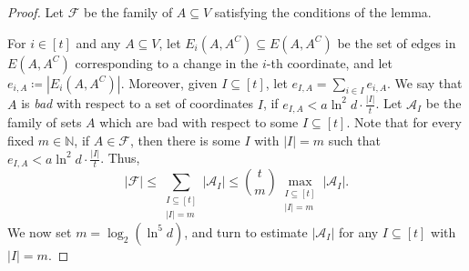 \documentclass[10pt,a4paper]{amsart}
\begin{document}
\begin{proof}
Let $\mathcal{F}$ be the family of $A\subseteq V$ satisfying the conditions of the lemma.

For $i\in [t]$ and any $A\subseteq V$, let $E_i(A,A^C)\subseteq E(A,A^C)$ be the set of edges in $E(A,A^C)$ corresponding to a change in the $i$-th coordinate, and let $e_{i,A}\coloneqq |E_i(A,A^C)|$. Moreover, given $I\subseteq [t]$, let $e_{I,A}=\sum_{i\in I}e_{i,A}$. We say that $A$ is \textit{bad} with respect to a set of coordinates $I$, if $e_{I,A}< a\ln^2d\cdot \frac{|I|}{t}$. Let $\mathcal{A}_{I}$ be the family of sets $A$ which are bad with respect to some $I\subseteq [t]$. Note that for every fixed $m \in \mathbb{N}$, if $A\in \mathcal{F}$, then there is some $I$ with $|I|=m$ such that $e_{I,A}< a\ln^2d\cdot \frac{|I|}{t}$. Thus,
\[|\mathcal{F}|\le \sum_{\substack{I \subseteq [t]\\|I|=m}} |\mathcal{A}_I| \leq \binom{t}{m} \max_{\substack{I \subseteq [t]\\|I|=m}} |\mathcal{A}_I|.\]
We now set $m=\log_2\left(\ln^5 d\right)$, and turn to estimate $|\mathcal{A}_I|$ for any $I \subseteq [t]$ with $|I|=m$.


\end{proof}
\end{document}
